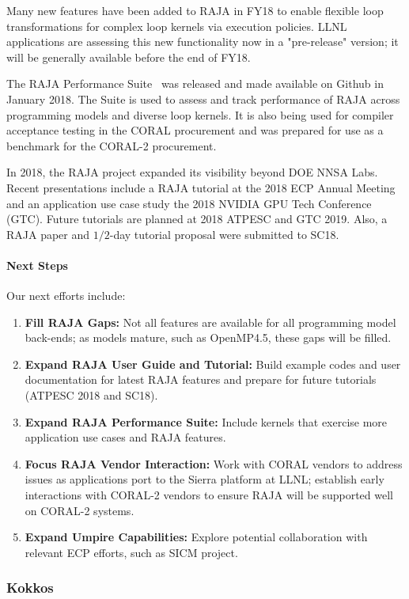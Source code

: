 Many new features have been added to RAJA in FY18 to enable flexible
loop transformations for complex loop kernels via execution policies.
LLNL applications are assessing this new functionality now in a 
"pre-release" version; it will be generally available before the end of FY18.

The RAJA Performance Suite~\cite{RAJAPerf-github} was released and made 
available on Github in January 2018. The Suite is used to assess and track 
performance of RAJA across programming models and diverse loop 
kernels. It is also being used for compiler acceptance testing in the CORAL 
procurement and was prepared for use as a benchmark for the CORAL-2 procurement.

In 2018, the RAJA project expanded its visibility beyond DOE NNSA Labs. 
Recent presentations include a RAJA tutorial at the 2018 ECP Annual Meeting 
and an application use case study the 2018 NVIDIA GPU Tech Conference (GTC). 
Future tutorials are planned at 2018 ATPESC and GTC 2019. Also, a RAJA paper 
and $1/2$-day tutorial proposal were submitted to SC18.

\paragraph{Next Steps}

Our next efforts include:
\begin{enumerate}
\item {\bf Fill RAJA Gaps:} Not all features are available for all programming
  model back-ends; as models mature, such as OpenMP4.5, these gaps will be
    filled.
\item {\bf Expand RAJA User Guide and Tutorial:} Build example codes and user
  documentation for latest RAJA features and prepare for future tutorials
    (ATPESC 2018 and SC18).
\item {\bf Expand RAJA Performance Suite:} Include kernels that exercise more
  application use cases and RAJA features.
\item {\bf Focus RAJA Vendor Interaction:} Work with CORAL vendors to address
  issues as applications port to the Sierra platform at LLNL; establish early
    interactions with CORAL-2 vendors to ensure RAJA will be supported well on
    CORAL-2 systems.
\item {\bf Expand Umpire Capabilities:} Explore potential collaboration with
  relevant ECP efforts, such as SICM project.
\end{enumerate}
\subsubsection{ Kokkos} 

